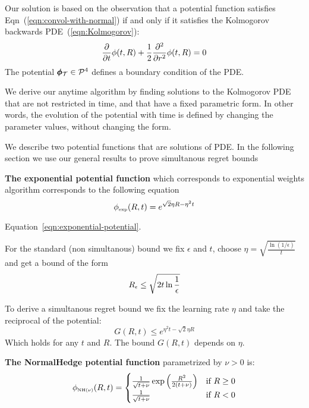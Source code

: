 \documentclass{article}[12pt]
\begin{document}
Our solution is based on the observation that a potential function satisfies Eqn~(\ref{eqn:convol-with-normal}) if and only if it satisfies 
the Kolmogorov backwards PDE~(\ref{eqn:Kolmogorov}):
\begin{equation} 
  \frac{\partial}{\partial t} \phi(t,R)
  + \frac{1}{2} \frac{\partial^2}{\partial r^2} \phi(t,R)=0
\end{equation}
The potential $\pmb{\phi}_{\mathcal{T}} \in {\cal P}^{4}$ defines a boundary condition of the PDE.

We derive our anytime algorithm by finding solutions to the Kolmogorov
PDE that are not restricted in time, and that have a fixed parametric
form.  In other words, the evolution of the potential with time is
defined by changing the parameter values, without changing the form.

We describe two potential functions that are solutions of PDE. In the following section we use our general results to prove simultanous regret bounds

{\bf The exponential potential function} which corresponds to exponential
  weights algorithm corresponds to the following equation
\begin{equation} \label{eqn:exponential-potential}
    \phi_{\mbox{\tiny exp}}(R,t) = e^{\sqrt{2} \eta R - \eta^2 t}
\end{equation}

Equation~\ref{eqn:exponential-potential}.

For the standard (non simultanous) bound we fix $\epsilon$ and $t$,
choose $\eta = \sqrt{\frac{\ln (1/\epsilon)}{t}}$
and get a bound of the form 
  \begin{equation}
    R_\epsilon \leq \sqrt{2 t \ln \frac{1}{\epsilon}}
  \end{equation}

  To derive a simultanous regret bound we fix the learning rate $\eta$ and take the reciprocal of the potential:
 \[
    G(R,t) \leq e^{\eta^2 t - \sqrt{2}\eta R}
 \]
Which holds for any $t$ and $R$. The bound $G(R,t)$ depends on $\eta$.

  
{\bf The NormalHedge potential function} parametrized by $\nu>0$ is:
\begin{equation} \label{eqn:NormalHedge}
  \phi_{\mbox{\tiny NH$(\nu)$}}(R,t) = \begin{cases}
    \frac{1}{\sqrt{t+\nu}}\exp\left(\frac{R^2}{2(t+\nu)}\right)
    & \mbox{if } R \geq 0  \\
  \frac{1}{\sqrt{t+\nu}} & \mbox{if } R <0
  \end{cases}
\end{equation}
\end{document}
